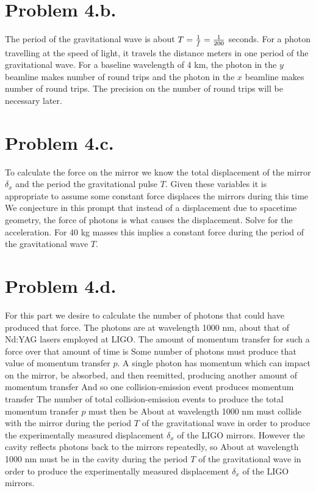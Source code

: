 \documentclass{article}
\begin{document}
\section*{Problem 4.b.}
The period of the gravitational wave is about $T=\frac{1}{f}=\frac{1}{200}$ seconds. For a photon travelling at the speed of light, it travels the distance
meters in one period of the gravitational wave. For a baseline wavelength of 4 km, the photon in the $y$ beamline makes
number of round trips and the photon in the $x$ beamline makes
number of round trips. The precision on the number of round trips will be necessary later.
\section*{Problem 4.c.}
To calculate the force on the mirror we know the total displacement of the mirror $\delta_x$ and the period the gravitational pulse $T$. Given these variables it is appropriate to assume some constant force displaces the mirrors during this time
We conjecture in this prompt that instead of a displacement due to spacetime geometry, the force of photons is what causes the displacement. Solve for the acceleration.
For 40 kg masses this implies a constant force
during the period of the gravitational wave $T$.
\section*{Problem 4.d.}
For this part we desire to calculate the number of photons that could have produced that force. The photons are at wavelength 1000 nm, about that of Nd:YAG lasers employed at LIGO. The amount of momentum transfer for such a force over that amount of time is
Some number of photons must produce that value of momentum transfer $p$. A single photon has momentum 
which can impact on the mirror, be absorbed, and then reemitted, producing another amount of momentum transfer
And so one collision-emission event produces momentum transfer
The number of total collision-emission events to produce the total momentum transfer $p$ must then be
About  at wavelength 1000 nm must collide with the mirror during the period $T$ of the gravitational wave in order to produce the experimentally measured displacement $\delta_x$ of the LIGO mirrors. However the cavity reflects photons back to the mirrors repeatedly, so
About  at wavelength 1000 nm must be in the cavity during the period $T$ of the gravitational wave in order to produce the experimentally measured displacement $\delta_x$ of the LIGO mirrors.
\end{document}
